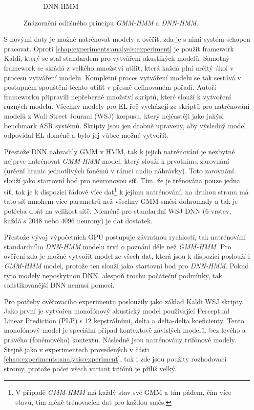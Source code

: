 \begin{figure}[htpb]
\begin{subfigure}[b]{0.4\textwidth}
    \caption{DNN-HMM}
    \label{fig:experiments:normalization:hmm:dnn}
  \end{subfigure}
  \caption{Znázornění odlišného principu \textit{GMM-HMM} a \textit{DNN-HMM}.}
  \label{fig:experiments:normalization:hmm}
\end{figure}

S novými daty je možné natrénovat modely a ověřit, zda je s nimi systém schopen pracovat. Oproti \ref{chap:experiments:analysis:experiment} je použit framework Kaldi, který se stal standardem pro vytváření akustikých modelů. Samotný framework se skládá z velkého množství utilit, která každá plní určitý  úkol v procesu vytváření modelu. Kompletní proces vytváření modelu se tak sestává v postupném spouštění těchto utilit v přesně definovaném pořadí. Autoři frameworku připravili nepřeberné množství skriptů, které slouží k vytvoření různých modelů. Všechny modely pro EL řeč vycházejí ze skriptů pro natrénování modelů z Wall Street Journal (WSJ) korpusu, který nejčastěji jako jakýsi benchmark ASR systémů. Skripty jsou jen drobně upraveny, aby výsledný model odpovídal EL doméně a bylo jej vůbec možné vytvořit.

Přestože DNN nahradily GMM v HMM, tak k jejich natrénování je nezbytné nejprve natrénovat \textit{GMM-HMM} model, který slouží k prvotnímu zarovnání (určení hranic jednotlivých fonémů v rámci audio náhrávky). Toto zarovnání slouží jako startovní bod pro neuronovou síť. Tím, že je trénována pouze jedna síť, tak je k dispozici řádově více dat\footnote{V případě \textit{GMM-HMM} má každý stav své GMM a tím pádem, čím více stavů, tím méně trénovacích dat pro každou směs.} k jejímu natrénování, na druhou stranu má tato síť mnohem více parametrů než všechny GMM směsi dohromady a tak je potřeba dbát na velikost sítě. Nicméně pro standardní WSJ DNN (6 vrstev, každá s 2048 nebo 4096 neurony) je dat dostatek.

Přestože vývoj výpočetních GPU postupuje závratnou rychlostí, tak natrénování standardního \textit{DNN-HMM} modelu trvá o poznání déle než \textit{GMM-HMM}. Pro ověření zda je možné vytvořit model ze všech dat, která jsou k dispozici poslouží i \textit{GMM-HMM} model, protože ten slouží jako startovní bod pro \textit{DNN-HMM}. Pokud tyto modely neposkytnou DNN, alespoň trochu  počáteční podmínky, tak sofistikovanější DNN nemusí pomoci.

Pro potřeby ověřovacího experimentu posloužily jako základ Kaldi WSJ skripty. Jako první je vytvořen monofónový akustický model používající Perceptual Linear Prediction (PLP) s 12 kepstrálními, delta a delta-delta koeficienty. Tento monofónový model je speciální případ kontextově závislých modelů, bez levého a pravého (fonémového) kontextu. Následně jsou natrénovány trifónové modely. Stejně jako v experimentech provedených v části \ref{chap:experiments:analysis:experiment}, tak i zde jsou použity rozhodovací stromy, protože počet všech variant trifónů je příliš velký.

